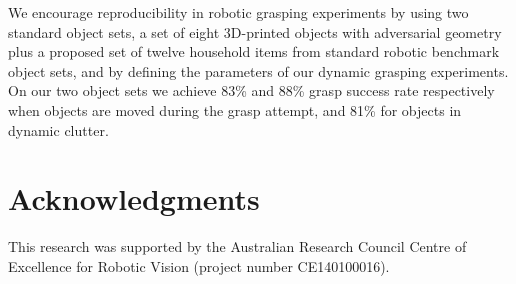 \documentclass[conference]{IEEEtran}
\begin{document}
We encourage reproducibility in robotic grasping experiments by using two standard object sets, a set of eight 3D-printed objects with adversarial geometry \cite{Mahler2017Dex2} plus a proposed set of twelve household items from standard robotic benchmark object sets, and by defining the parameters of our dynamic grasping experiments.  On our two object sets we achieve 83\% and 88\% grasp success rate respectively when objects are moved during the grasp attempt, and 81\% for objects in dynamic clutter.

\section*{Acknowledgments}

This research was supported by the Australian Research Council Centre of Excellence for Robotic Vision (project number CE140100016).




\end{document}
